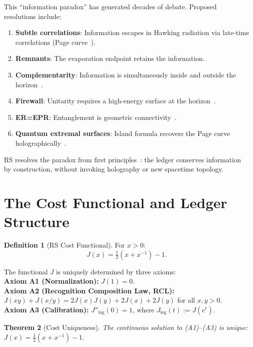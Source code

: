 \documentclass[12pt,a4paper]{article}
\newtheorem{theorem}{Theorem}[section]
\theoremstyle{definition}
\newtheorem{definition}[theorem]{Definition}
\theoremstyle{remark}
\begin{document}
This ``information paradox'' has generated decades of debate.
Proposed resolutions include:
\begin{enumerate}[nosep]
  \item \textbf{Subtle correlations}: Information escapes in
  Hawking radiation via late-time correlations (Page
  curve~\cite{Page1993}).
  \item \textbf{Remnants}: The evaporation endpoint retains the
  information.
  \item \textbf{Complementarity}: Information is simultaneously
  inside and outside the horizon~\cite{Susskind1993}.
  \item \textbf{Firewall}: Unitarity requires a high-energy surface
  at the horizon~\cite{AMPS2013}.
  \item \textbf{ER=EPR}: Entanglement is geometric
  connectivity~\cite{MaldacenaSusskind2013}.
  \item \textbf{Quantum extremal surfaces}: Island formula recovers
  the Page curve holographically~\cite{Penington2020}.
\end{enumerate}

RS resolves the paradox from first principles~\cite{RS_Axioms}: the
ledger conserves information by construction, without invoking
holography or new spacetime topology.

\section{The Cost Functional and Ledger Structure}
\label{sec:cost}

\begin{definition}[RS Cost Functional]
For $x > 0$:
\begin{equation}
  J(x) = \tfrac{1}{2}(x + x^{-1}) - 1.
\end{equation}
\end{definition}

\noindent The functional $J$ is uniquely determined by three axioms:\\
\textbf{Axiom A1 (Normalization):} $J(1) = 0$.\\
\textbf{Axiom A2 (Recognition Composition Law, RCL):}
$J(xy) + J(x/y) = 2J(x)J(y) + 2J(x) + 2J(y)$ for all $x, y > 0$.\\
\textbf{Axiom A3 (Calibration):} $J''_{\log}(0) = 1$, where
$J_{\log}(t) := J(e^t)$.

\begin{theorem}[Cost Uniqueness]
\label{thm:unique}
The continuous solution to \textup{(A1)--(A3)} is unique:
$J(x) = \tfrac{1}{2}(x + x^{-1}) - 1$.
\end{theorem}
\end{document}
